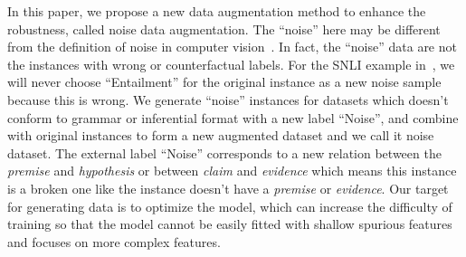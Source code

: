 In this paper, we propose a new data augmentation method
to enhance the robustness,
called noise data augmentation.
The ``noise'' here may be different from the definition of noise in computer vision~\cite{}. 
In fact, the ``noise'' data are not the instances with wrong or counterfactual labels.
For the SNLI example in~, we will never choose ``Entailment'' 
for the original instance as a new noise sample because this is wrong.
We generate ``noise'' instances for datasets which doesn't conform to grammar 
or inferential format with a new label ``Noise'',
and combine with original instances to form a new augmented dataset and we call it noise dataset. 
The external label ``Noise'' corresponds to a new relation between the \textit{premise} and \textit{hypothesis}
or between \textit{claim} and \textit{evidence} 
which means this instance is a broken one like the instance doesn't 
have a \textit{premise} or \textit{evidence}. 
Our target for generating data is to optimize %
the model, which can 
increase the difficulty of training so that the model cannot be easily
fitted with shallow spurious features and focuses on more complex features.
  
